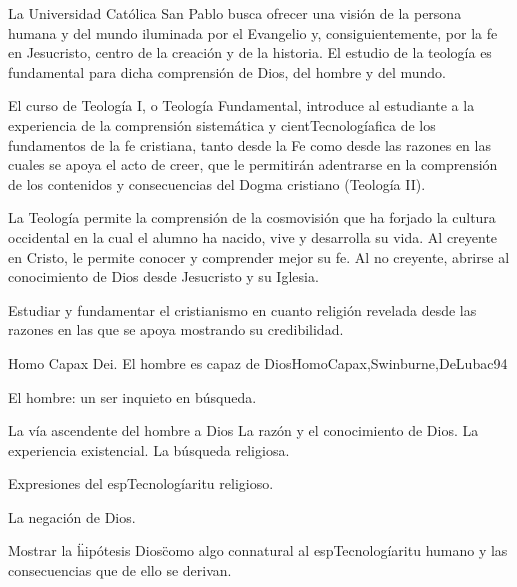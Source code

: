 \begin{syllabus}


\begin{justification}
La Universidad Católica San Pablo busca ofrecer una visión de la persona humana y del mundo iluminada por el Evangelio y, consiguientemente, por la fe en Jesucristo, centro de la creación y de la historia. El estudio de la teología es fundamental para dicha comprensión de Dios, del hombre y del mundo.

El curso de Teología I, o Teología Fundamental, introduce al estudiante a la experiencia de la comprensión sistemática y cientTecnologíafica de los fundamentos de la fe cristiana, tanto desde la Fe como desde las razones en las cuales se apoya el acto de creer, que le permitirán adentrarse en la comprensión de los contenidos y consecuencias del Dogma cristiano (Teología II).

La Teología permite la comprensión de la cosmovisión que ha forjado la cultura occidental en la cual el alumno ha nacido, vive y desarrolla su vida. Al creyente en Cristo, le permite conocer y comprender mejor su fe. Al no creyente, abrirse al conocimiento de Dios desde Jesucristo y su Iglesia.
\end{justification}

\begin{goals}
\item Estudiar y fundamentar el cristianismo en cuanto religión revelada desde las razones en las que se apoya mostrando su credibilidad. 
\end{goals}

\begin{outcomes}
\end{outcomes}

\begin{unit}{Homo Capax Dei. El hombre es capaz de Dios}{HomoCapax,Swinburne,DeLubac}{9}{4}
\begin{topics}
	\item El hombre: un ser inquieto en búsqueda.
	\item	La vía ascendente del hombre a Dios
		\subitem	La razón y el conocimiento de Dios.
		\subitem	La experiencia existencial.
		\subitem	La búsqueda religiosa.
	\item	Expresiones del espTecnologíaritu religioso.
	\item	La negación de Dios.
\end{topics}
\begin{learningoutcomes}
	\item Mostrar la \"hipótesis Dios\" como algo connatural al espTecnologíaritu humano y las consecuencias que de ello se derivan.
\end{learningoutcomes}
\end{unit}


\end{syllabus}

